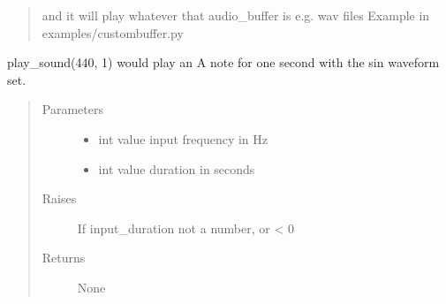 \documentclass[letterpaper,10pt,english]{sphinxmanual}
\begin{document}
\begin{fulllineitems}
\begin{fulllineitems}
\begin{description}
\begin{quote}
\sphinxAtStartPar
and it will play whatever that audio\_buffer is e.g. wav files
Example in examples/custombuffer.py
\end{quote}

\sphinxAtStartPar
play\_sound(440, 1) would play an A note for one second with the sin waveform set.

\end{description}
\begin{quote}\begin{description}
\item[{Parameters}] \leavevmode\begin{itemize}
\item {} 
\sphinxAtStartPar
{} \textendash{} int value \sphinxhyphen{} input frequency in Hz

\item {} 
\sphinxAtStartPar
{} \textendash{} int value \sphinxhyphen{} duration in seconds

\end{itemize}

\item[{Raises}] \leavevmode
\sphinxAtStartPar
{} \textendash{} If input\_duration not a number, or \textless{} 0

\item[{Returns}] \leavevmode
\sphinxAtStartPar
None

\end{description}\end{quote}

\end{fulllineitems}



\end{fulllineitems}
\end{document}
